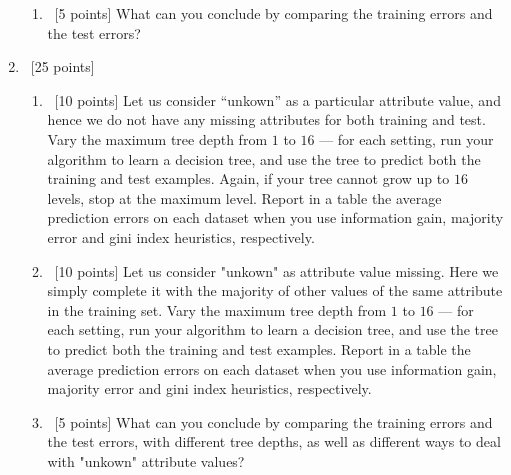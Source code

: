 \documentclass[12pt, fullpage,letterpaper]{article}
\begin{document}
\begin{enumerate}
\begin{enumerate}
\item~[5 points] What can you conclude by comparing the training errors and the test errors? 
\end{enumerate}


\item~[25 points] 
\begin{enumerate}
	\item~[10 points] Let us consider ``unkown'' as a particular attribute value, and hence we do not have any missing attributes for both training and test. Vary the maximum  tree depth from $1$ to $16$ --- for each setting, run your algorithm to learn a decision tree, and use the tree to  predict both the training  and test examples. Again, if your tree cannot grow up to $16$ levels, stop at the maximum level. Report in a table the average prediction errors on each dataset when you use information gain, majority error and gini index heuristics, respectively.
	
	\item~[10 points] Let us consider "unkown" as  attribute value missing. Here we simply complete it with the majority of other values of the same attribute in the training set.   Vary the maximum  tree depth from $1$ to $16$ --- for each setting, run your algorithm to learn a decision tree, and use the tree to  predict both the training  and test examples. Report in a table the average prediction errors on each dataset when you use information gain, majority error and gini index heuristics, respectively.
	
	
	\item~[5 points] What can you conclude by comparing the training errors and the test errors, with different tree depths, as well as different ways to deal with "unkown" attribute values?
\end{enumerate}
\end{enumerate}
\end{document}
